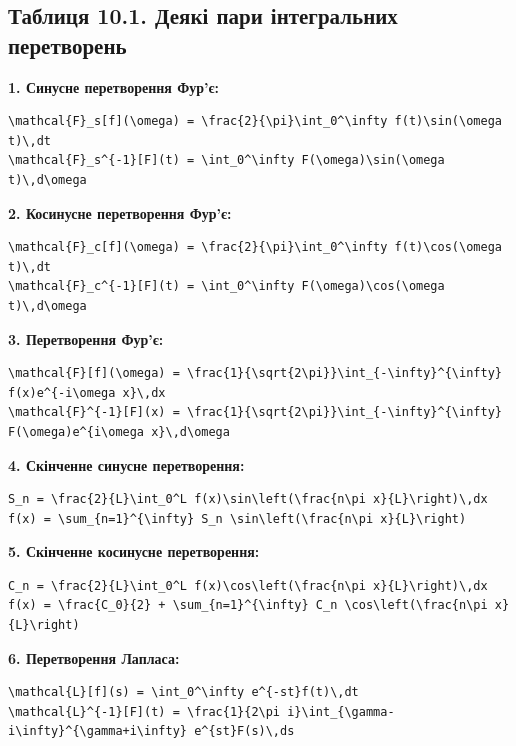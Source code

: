 \documentclass[
  ukrainian,
]{article}
\begin{document}
\subsection{Таблиця 10.1. Деякі пари інтегральних
перетворень}\label{ux442ux430ux431ux43bux438ux446ux44f-10.1.-ux434ux435ux44fux43aux456-ux43fux430ux440ux438-ux456ux43dux442ux435ux433ux440ux430ux43bux44cux43dux438ux445-ux43fux435ux440ux435ux442ux432ux43eux440ux435ux43dux44c}

\textbf{1. Синусне перетворення Фур'є:}

\begin{verbatim}
\mathcal{F}_s[f](\omega) = \frac{2}{\pi}\int_0^\infty f(t)\sin(\omega t)\,dt
\mathcal{F}_s^{-1}[F](t) = \int_0^\infty F(\omega)\sin(\omega t)\,d\omega
\end{verbatim}

\textbf{2. Косинусне перетворення Фур'є:}

\begin{verbatim}
\mathcal{F}_c[f](\omega) = \frac{2}{\pi}\int_0^\infty f(t)\cos(\omega t)\,dt
\mathcal{F}_c^{-1}[F](t) = \int_0^\infty F(\omega)\cos(\omega t)\,d\omega
\end{verbatim}

\textbf{3. Перетворення Фур'є:}

\begin{verbatim}
\mathcal{F}[f](\omega) = \frac{1}{\sqrt{2\pi}}\int_{-\infty}^{\infty} f(x)e^{-i\omega x}\,dx
\mathcal{F}^{-1}[F](x) = \frac{1}{\sqrt{2\pi}}\int_{-\infty}^{\infty} F(\omega)e^{i\omega x}\,d\omega
\end{verbatim}

\textbf{4. Скінченне синусне перетворення:}

\begin{verbatim}
S_n = \frac{2}{L}\int_0^L f(x)\sin\left(\frac{n\pi x}{L}\right)\,dx
f(x) = \sum_{n=1}^{\infty} S_n \sin\left(\frac{n\pi x}{L}\right)
\end{verbatim}

\textbf{5. Скінченне косинусне перетворення:}

\begin{verbatim}
C_n = \frac{2}{L}\int_0^L f(x)\cos\left(\frac{n\pi x}{L}\right)\,dx
f(x) = \frac{C_0}{2} + \sum_{n=1}^{\infty} C_n \cos\left(\frac{n\pi x}{L}\right)
\end{verbatim}

\textbf{6. Перетворення Лапласа:}

\begin{verbatim}
\mathcal{L}[f](s) = \int_0^\infty e^{-st}f(t)\,dt
\mathcal{L}^{-1}[F](t) = \frac{1}{2\pi i}\int_{\gamma-i\infty}^{\gamma+i\infty} e^{st}F(s)\,ds
\end{verbatim}
\end{document}
